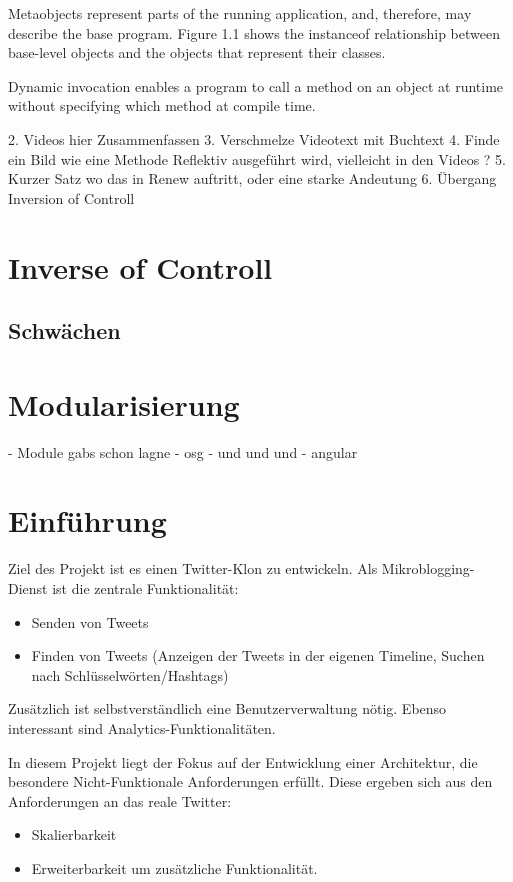 \begin{itemize}
Metaobjects represent parts of the running application, and, therefore, may describe the base program. Figure 1.1 shows the instanceof relationship between base-level objects and the objects that represent their classes. 

Dynamic invocation enables a program to call a method on an object at runtime without specifying which method at compile time.

 2. Videos hier Zusammenfassen 
 3. Verschmelze Videotext mit Buchtext 
 4. Finde ein Bild wie eine Methode Reflektiv ausgeführt wird, vielleicht in den Videos ? 
 5. Kurzer Satz wo das in Renew auftritt, oder eine starke Andeutung 
 6. Übergang Inversion of Controll 

\section{Inverse of Controll}
\label{sec:inverse_of_controll}

\subsection{Schwächen} %
\label{sub:schwächen}

\section{Modularisierung}
\label{sec:modularisierung}
- Module gabs schon lagne 
- osg 
- und und und 
- angular 


\section{Einführung}
Ziel des Projekt ist es einen Twitter-Klon zu entwickeln. Als Mikroblogging-Dienst ist die zentrale Funktionalität:
\begin{itemize}
  \item Senden von Tweets
  \item Finden von Tweets (Anzeigen der Tweets in der eigenen Timeline, Suchen nach Schlüsselwörten/Hashtags)
\end{itemize}
Zusätzlich ist selbstverständlich eine Benutzerverwaltung nötig. Ebenso interessant sind Analytics-Funktionalitäten.

In diesem Projekt liegt der Fokus auf der Entwicklung  einer Architektur, die besondere Nicht-Funktionale Anforderungen
erfüllt. Diese ergeben sich aus den Anforderungen an das reale Twitter:
\begin{itemize}
  \item Skalierbarkeit
  \item Erweiterbarkeit um zusätzliche Funktionalität.
\end{itemize}


\end{itemize}
